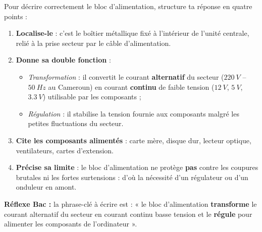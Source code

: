\documentclass[11pt]{article}
\newcommand{\cle}[1]{{\popxbold\color{popdark}#1}}
\begin{document}
\begin{methode}
Pour décrire correctement le \cle{bloc d'alimentation}, structure ta réponse en quatre points :
\begin{enumerate}
\item \textbf{Localise-le} : c'est le boîtier métallique fixé à l'intérieur de l'unité centrale, relié à la prise secteur par le câble d'alimentation.
\item \textbf{Donne sa double fonction} :
\begin{itemize}
\item \emph{Transformation} : il convertit le courant \textbf{alternatif} du secteur ($\SI{220}{V}$ -- $\SI{50}{Hz}$ au Cameroun) en courant \textbf{continu} de faible tension ($\SI{12}{V}$, $\SI{5}{V}$, $\SI{3,3}{V}$) utilisable par les composants ;
\item \emph{Régulation} : il stabilise la tension fournie aux composants malgré les petites fluctuations du secteur.
\end{itemize}
\item \textbf{Cite les composants alimentés} : carte mère, disque dur, lecteur optique, ventilateurs, cartes d'extension.
\item \textbf{Précise sa limite} : le bloc d'alimentation ne protège \textbf{pas} contre les coupures brutales ni les fortes surtensions : d'où la nécessité d'un régulateur ou d'un onduleur en amont.
\end{enumerate}
\textbf{Réflexe Bac :} la phrase-clé à écrire est : « le bloc d'alimentation \textbf{transforme} le courant alternatif du secteur en courant continu basse tension et le \textbf{régule} pour alimenter les composants de l'ordinateur ».
\end{methode}
\end{document}
